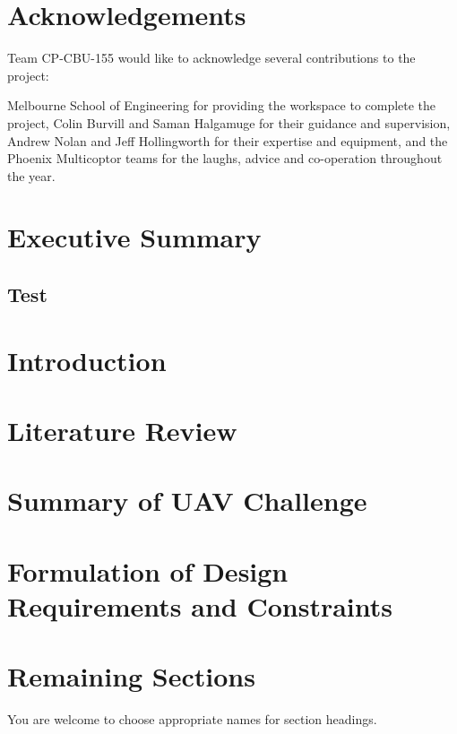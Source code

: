 \documentclass[]{article}
\begin{document}
\vfill
\vfill

\newpage

\section*{Acknowledgements}
Team CP-CBU-155 would like to acknowledge several contributions to the project:

Melbourne School of Engineering for providing the workspace to complete the project, Colin Burvill and Saman Halgamuge for their guidance and supervision, Andrew Nolan and Jeff Hollingworth for their expertise and equipment, and the Phoenix Multicoptor teams for the laughs, advice and co-operation throughout the year.



\newpage
\section{Executive Summary}


\subsection{Test}

\section{Introduction}


\section{Literature Review}


\section{Summary of UAV Challenge}


\section{Formulation of Design Requirements and Constraints}


\section{Remaining Sections}
You are welcome to choose appropriate names for section headings.
\end{document}
